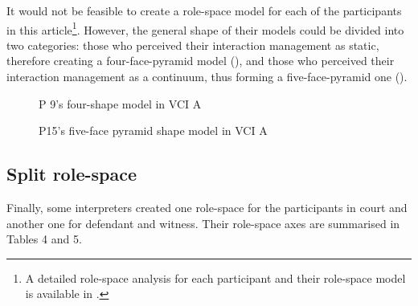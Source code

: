\documentclass[output=paper]{langsci/langscibook}
\begin{document}
It would not be feasible to create a role-space model for each of the participants in this article\footnote{A detailed role-space analysis for each participant and their role-space model is available in \citet{Devaux2017b}.}. However, the general shape of their models could be divided into two categories: those who perceived their interaction management as static, therefore creating a four-face-pyramid model (), and those who perceived their interaction management as a continuum, thus forming a five-face-pyramid one ().  

  

 

\begin{figure}
\caption{P 9's four-shape model in \textsc{VCI} A\label{fig:devaux:3}}
\end{figure}

\begin{figure}
\caption{P15's five-face pyramid shape model in \textsc{VCI} A\label{fig:devaux:4}}
\end{figure}

\subsection{Split role-space}
\label{sub:devaux:5.4}
Finally, some interpreters created one role-space for the participants in court and another one for defendant and witness. Their role-space axes are summarised in Tables 4 and 5. 
\end{document}
